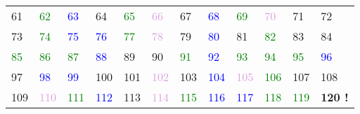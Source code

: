 \begin{pf}
\begin{center}
\begin{tabular}{llllllllllll}
\textcolor{BrickRed}{61} &\textcolor{green}{62} &\textcolor{blue}{63} &\textcolor{BrickRed}{64} &\textcolor{green}{65} &\textcolor{Plum}{66} &\textcolor{BrickRed}{67} &\textcolor{blue}{68} &\textcolor{green}{69} &\textcolor{Plum}{70} &\textcolor{BrickRed}{71} &72 \\
\textcolor{BrickRed}{73} &\textcolor{green}{74} &\textcolor{blue}{75} &\textcolor{blue}{76} &\textcolor{green}{77} &\textcolor{Plum}{78} &\textcolor{BrickRed}{79} &\textcolor{blue}{80} &\textcolor{BrickRed}{81} &\textcolor{green}{82} &\textcolor{BrickRed}{83} &84 \\
\textcolor{green}{85} &\textcolor{green}{86} &\textcolor{green}{87} &\textcolor{blue}{88} &\textcolor{BrickRed}{89} &90 &\textcolor{green}{91} &\textcolor{blue}{92} &\textcolor{green}{93} &\textcolor{green}{94} &\textcolor{green}{95} &\textcolor{blue}{96} \\
\textcolor{BrickRed}{97} &\textcolor{blue}{98} &\textcolor{blue}{99} &100 &\textcolor{BrickRed}{101} &\textcolor{Plum}{102} &\textcolor{BrickRed}{103} &\textcolor{blue}{104} &\textcolor{Plum}{105} &\textcolor{green}{106} &\textcolor{BrickRed}{107} &108 \\
\textcolor{BrickRed}{109} &\textcolor{Plum}{110} &\textcolor{green}{111} &\textcolor{blue}{112} &\textcolor{BrickRed}{113} &\textcolor{Plum}{114} &\textcolor{green}{115} &\textcolor{blue}{116} &\textcolor{blue}{117} &\textcolor{green}{118} &\textcolor{green}{119} &\textbf{120 !} \\
\end{tabular}
\end{center}


\end{pf}
